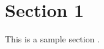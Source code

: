 

\section{Section 1}
\label{sec:section1}


This is a sample section \cite[Chapter 1]{muller2016introduction}.

